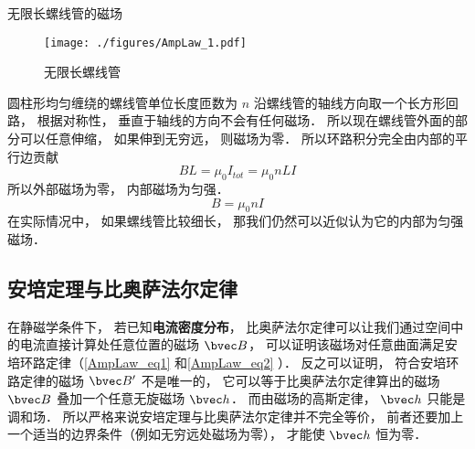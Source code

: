 \begin{example}{无限长螺线管的磁场}\label{AmpLaw_ex2}
\begin{figure}[ht]
\centering
\texttt{[image: ./figures/AmpLaw\_1.pdf]}
\caption{无限长螺线管} \label{AmpLaw_fig1}
\end{figure}
圆柱形均匀缠绕的螺线管单位长度匝数为 $n$ 沿螺线管的轴线方向取一个长方形回路， 根据对称性， 垂直于轴线的方向不会有任何磁场． 所以现在螺线管外面的部分可以任意伸缩， 如果伸到无穷远， 则磁场为零． 所以环路积分完全由内部的平行边贡献
\begin{equation}
BL = \mu_0 I_{tot} = \mu_0 nLI
\end{equation}
所以外部磁场为零， 内部磁场为匀强．
\begin{equation}
B = \mu_0 nI
\end{equation}
在实际情况中， 如果螺线管比较细长， 那我们仍然可以近似认为它的内部为匀强磁场．
\end{example}

\subsection{安培定理与比奥萨法尔定律}

在静磁学条件下， 若已知\textbf{电流密度分布}， 比奥萨法尔定律可以让我们通过空间中的电流直接计算处任意位置的磁场 $\bvec B$， 可以证明该磁场对任意曲面满足安培环路定律（\autoref{AmpLaw_eq1} 和\autoref{AmpLaw_eq2} ）． 反之可以证明， 符合安培环路定律的磁场 $\bvec B'$ 不是唯一的， 它可以等于比奥萨法尔定律算出的磁场 $\bvec B$ 叠加一个任意无旋磁场 $\bvec h$． 而由磁场的高斯定律， $\bvec h$ 只能是调和场． 所以严格来说安培定理与比奥萨法尔定律并不完全等价， 前者还要加上一个适当的边界条件（例如无穷远处磁场为零）， 才能使 $\bvec h$ 恒为零．

